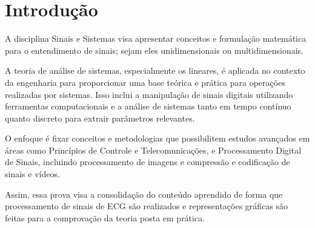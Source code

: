 \section{Introdução}
A disciplina Sinais e Sistemas visa apresentar conceitos e formulação matemática para o entendimento de sinais; sejam eles unidimensionais ou multidimensionais.

A teoria de análise de sistemas, especialmente os lineares, é aplicada no contexto da engenharia para proporcionar uma base teórica e prática para operações realizadas por sistemas. Isso inclui a manipulação de sinais digitais utilizando ferramentas computacionais e a análise de sistemas tanto em tempo contínuo quanto discreto para extrair parâmetros relevantes.

O enfoque é fixar conceitos e metodologias que possibilitem estudos avançados em áreas como Princípios de Controle e Telecomunicações, e Processamento Digital de Sinais, incluindo processamento de imagens e compressão e codificação de sinais e vídeos.

Assim, essa prova visa a consolidação do conteúdo aprendido de forma que processamento de sinais de ECG são realizados e representações gráficas são feitas para a comprovação da teoria posta em prática.